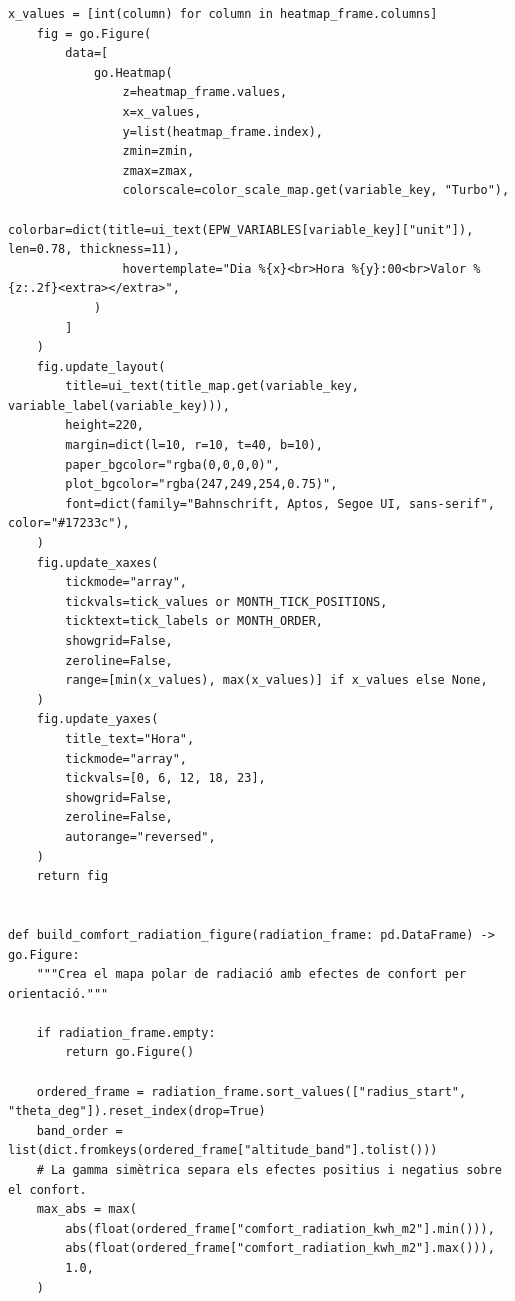 \documentclass[10pt,a4paper]{article}
\begin{document}
\begin{lstlisting}[style=studioPython,caption={backend/epw\_figures.py},label={lst:backend-epw-figures-py}]
    x_values = [int(column) for column in heatmap_frame.columns]
    fig = go.Figure(
        data=[
            go.Heatmap(
                z=heatmap_frame.values,
                x=x_values,
                y=list(heatmap_frame.index),
                zmin=zmin,
                zmax=zmax,
                colorscale=color_scale_map.get(variable_key, "Turbo"),
                colorbar=dict(title=ui_text(EPW_VARIABLES[variable_key]["unit"]), len=0.78, thickness=11),
                hovertemplate="Dia %{x}<br>Hora %{y}:00<br>Valor %{z:.2f}<extra></extra>",
            )
        ]
    )
    fig.update_layout(
        title=ui_text(title_map.get(variable_key, variable_label(variable_key))),
        height=220,
        margin=dict(l=10, r=10, t=40, b=10),
        paper_bgcolor="rgba(0,0,0,0)",
        plot_bgcolor="rgba(247,249,254,0.75)",
        font=dict(family="Bahnschrift, Aptos, Segoe UI, sans-serif", color="#17233c"),
    )
    fig.update_xaxes(
        tickmode="array",
        tickvals=tick_values or MONTH_TICK_POSITIONS,
        ticktext=tick_labels or MONTH_ORDER,
        showgrid=False,
        zeroline=False,
        range=[min(x_values), max(x_values)] if x_values else None,
    )
    fig.update_yaxes(
        title_text="Hora",
        tickmode="array",
        tickvals=[0, 6, 12, 18, 23],
        showgrid=False,
        zeroline=False,
        autorange="reversed",
    )
    return fig


def build_comfort_radiation_figure(radiation_frame: pd.DataFrame) -> go.Figure:
    """Crea el mapa polar de radiació amb efectes de confort per orientació."""

    if radiation_frame.empty:
        return go.Figure()

    ordered_frame = radiation_frame.sort_values(["radius_start", "theta_deg"]).reset_index(drop=True)
    band_order = list(dict.fromkeys(ordered_frame["altitude_band"].tolist()))
    # La gamma simètrica separa els efectes positius i negatius sobre el confort.
    max_abs = max(
        abs(float(ordered_frame["comfort_radiation_kwh_m2"].min())),
        abs(float(ordered_frame["comfort_radiation_kwh_m2"].max())),
        1.0,
    )


\end{lstlisting}
\end{document}
